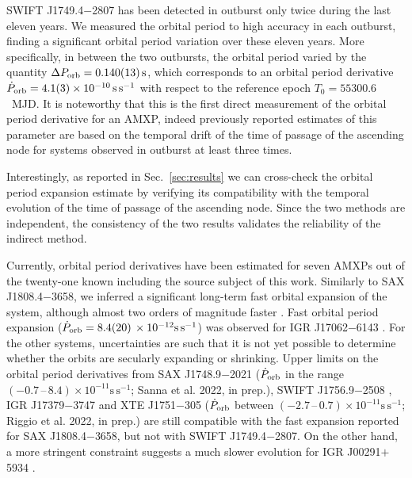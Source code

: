 \documentclass[fleqn,usenatbib]{mnras}
\newcommand{\swiftj}{SWIFT J1749.4$-$2807}
\begin{document}
\swiftj{} has been detected in outburst only twice during the last eleven years. We measured the orbital period to high accuracy in each outburst, finding a significant orbital period variation over these eleven years. More specifically, in between the two outbursts, the orbital period varied by the quantity $\Delta P_{\rm orb}=0.140(13)\,\text{s}$, which corresponds to an orbital period derivative $\dot{P}_{\rm orb}=4.1(3)\times 10^{-10}\,\text{s}\,\text{s}^{-1}$ with respect to the reference epoch $T_0 = 55300.6$~MJD. It is noteworthy that this is the first direct measurement of the orbital period derivative for an AMXP, indeed previously reported estimates of this parameter are based on the temporal drift of the time of passage of the ascending node for systems observed in outburst at least three times.  

Interestingly, as reported in Sec.~\ref{sec:results} we can cross-check the orbital period expansion estimate by verifying its compatibility with the temporal evolution of the time of passage of the ascending node. Since the two methods are independent, the consistency of the two results validates the reliability of the indirect method.  

Currently, orbital period derivatives have been estimated for seven AMXPs out of the twenty-one known including the source subject of this work. Similarly to SAX J1808.4$-$3658, we inferred a significant long-term fast orbital expansion of the system, although almost two orders of magnitude faster \citep[$\dot{P}_{\rm orb}=1.7(5)\,\times 10^{-12}\text{s}\,\text{s}^{-1}$, see e.g.,][]{di-Salvo:2008uu, Patruno:2017ah,Sanna:2017vj,Bult:2020tu}. Fast orbital period expansion ($\dot{P}_{\rm orb}=8.4(20)\,\times 10^{-12}\text{s}\,\text{s}^{-1}$) was observed for IGR J17062$-$6143 \citep{Bult:2021vs}. For the other systems, uncertainties are such that it is not yet possible to determine whether the orbits are secularly expanding or shrinking. Upper limits on the orbital period derivatives from SAX J1748.9$-$2021 ($\dot{P}_{\rm orb}$ in the range $(-0.7\,\mbox{--}\,8.4)\times 10^{-11}\text{s}\,\text{s}^{-1}$; Sanna et al. 2022, in prep.), SWIFT J1756.9$-$2508 \citep[$\dot{P}_{\rm orb}$ ranging between $(-4.1\,\mbox{--}\,7.1)\times 10^{-12}\text{s}\,\text{s}^{-1}$, see e.g.,][]{Bult:2018ve,Sanna:2018aa}, IGR J17379$-$3747 \citep[$\dot{P}_{\rm orb}$ between $(-9.4\,\mbox{--}\,4.4)\times 10^{-12}\text{s}\,\text{s}^{-1}$;][]{Sanna:2018tx} and XTE J1751$-$305 ($\dot{P}_{\rm orb}$ between $(-2.7\,\mbox{--}\,0.7)\times 10^{-11}\text{s}\,\text{s}^{-1}$; Riggio et al. 2022, in prep.) are still compatible with the fast expansion reported for SAX J1808.4$-$3658, but not with \swiftj{}. On the other hand, a more stringent constraint suggests a much slower evolution for IGR J00291$+$5934 \citep[$\dot{P}_{\rm orb}$ between $(-6.6\,\mbox{--}\,6.5)\times 10^{-13}\text{s}\,\text{s}^{-1}$, see e.g.,][]{Patruno:2017vp, Sanna:2017tx}.
\end{document}
